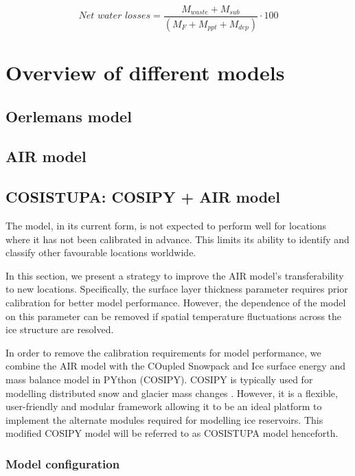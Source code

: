 \begin{equation} \textit{Net water losses} = \frac{M_{waste}+M_{sub}}{(M_F+M_{ppt}+M_{dep})} \cdot 100 \end{equation}

\section{Overview of different models}

\subsection{Oerlemans model}

\subsection{AIR model}

\subsection{COSISTUPA: COSIPY + AIR model}
\label{sec:Cosistupa}

The model, in its current form, is not expected to perform well for locations where it has not been calibrated
in advance. This limits its ability to identify and classify other favourable locations worldwide.

In this section, we present a strategy to improve the AIR model's transferability to new locations.
Specifically, the surface layer thickness parameter requires prior calibration for better model performance.
However, the dependence of the model on this parameter can be removed if spatial temperature fluctuations across
the ice structure are resolved.

In order to remove the calibration requirements for model performance, we combine the AIR model with the COupled
Snowpack and Ice surface energy and mass balance model in PYthon (COSIPY). COSIPY is typically used for
modelling distributed snow and glacier mass changes \citep{sauterCOSIPYV1Opensource2020}. However, it is a
flexible, user-friendly and modular framework allowing it to be an ideal platform to implement the alternate
modules required for modelling ice reservoirs. This modified COSIPY model will be referred to as COSISTUPA model
henceforth.

\subsubsection{Model configuration}

